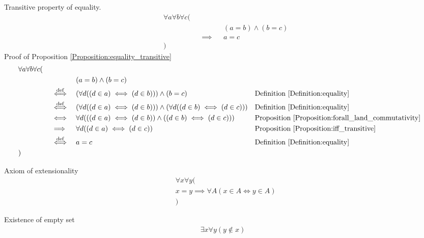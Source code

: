 \begin{prop}
\label{Proposition:equality_transitive}
Transitive property of equality.
\begin{align*}
& \forall a \forall b \forall c ( \\
& \quad && && (a = b) \land (b = c) \\
& \quad && \implies && a = c \\
& )
\end{align*}
Proof of Proposition \ref{Proposition:equality_transitive}
\begin{align*}
& \forall a \forall b \forall c ( \\
& \quad && && (a = b) \land (b = c) \\
& \quad && \overset{\operatorname{def}}{\iff} && (\forall d ((d \in a) \iff (d \in b))) \land (b = c)
&& \text{Definition \ref{Definition:equality}} \\
& \quad && \overset{\operatorname{def}}{\iff} && (\forall d ((d \in a) \iff (d \in b))) \land (\forall d ((d \in b) \iff (d \in c)))
&& \text{Definition \ref{Definition:equality}} \\
& \quad && \iff && \forall d (((d \in a) \iff (d \in b)) \land ((d \in b) \iff (d \in c)))
&& \text{Proposition \ref{Proposition:forall_land_commutativity}} \\
& \quad && \implies && \forall d ((d \in a) \iff (d \in c))
&& \text{Proposition \ref{Proposition:iff_transitive}} \\
& \quad && \overset{\operatorname{def}}{\iff} && a = c
&& \text{Definition \ref{Definition:equality}} \\
& )
\end{align*}
\end{prop}

\begin{axm}
Axiom of extensionality
\begin{align*}
& \forall x \forall y ( \\
& x = y \implies \forall A (x \in A  \iff y \in A) \\
& )
\end{align*}
\end{axm}

\begin{axm}
\label{Axiom:existence_of_empty_set}
Existence of empty set
\begin{align*}
\exists x \forall y (y \notin x)
\end{align*}
\end{axm}

